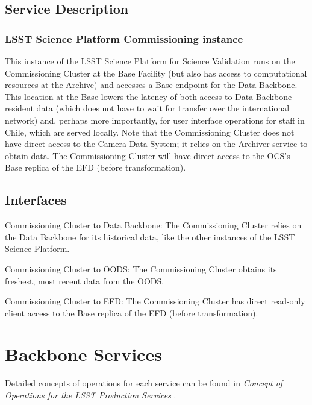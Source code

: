 \documentclass[DM,toc,lsstdraft]{lsstdoc}
\begin{document}
\subsection{Service Description}\label{commcluster-service}

\subsubsection{LSST Science Platform Commissioning
instance}\label{lsst-science-platform-commissioning-instance}

This instance of the LSST Science Platform for Science Validation runs
on the Commissioning Cluster at the Base Facility (but also has access
to computational resources at the Archive) and accesses a Base endpoint
for the Data Backbone. This location at the Base lowers the latency of
both access to Data Backbone-resident data (which does not have to wait
for transfer over the international network) and, perhaps more
importantly, for user interface operations for staff in Chile, which are
served locally. Note that the Commissioning Cluster does not have direct
access to the Camera Data System; it relies on the Archiver service to
obtain data. The Commissioning Cluster will have direct access to the
OCS's Base replica of the EFD (before transformation).

\subsection{Interfaces}\label{commcluster-interfaces}

Commissioning Cluster to Data Backbone: The Commissioning Cluster relies on the
Data Backbone for its historical data, like the other instances of the LSST Science
Platform.

Commissioning Cluster to OODS: The Commissioning Cluster obtains its freshest, most recent data from the OODS.

Commissioning Cluster to EFD: The Commissioning Cluster has direct read-only
client access to the Base replica of the EFD (before transformation).

\section{Backbone Services}\label{backbone-services}

Detailed concepts of operations for each service can be found in \textit{Concept of Operations for the LSST Production Services} .
\end{document}

